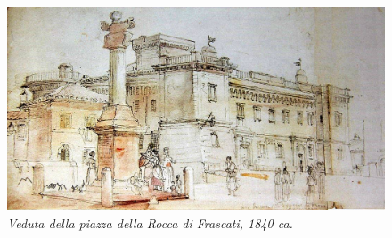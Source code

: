 \documentclass[
  letterpaper,
  DIV=11,
  numbers=noendperiod]{scrartcl}
\begin{document}
\begin{figure}[H]

{\centering \includegraphics{../../images/2024/san_rocco/11rocca-fontana-superiore.jpg}

}

\caption{\emph{Veduta della piazza della Rocca di Frascati, 1840 ca.}}

\end{figure}%
\end{document}
